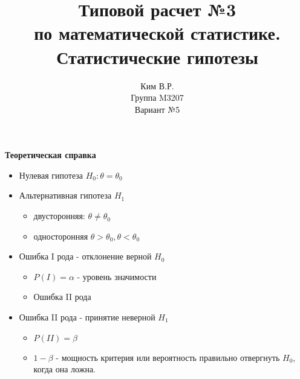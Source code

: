 \documentclass[a4paper,11pt]{article}
\title{Типовой расчет №3 \\ по математической статистике. \\ Статистические гипотезы}
\author{Ким В.Р. \\ Группа M3207 \\ Вариант №5}
\date{}
\newenvironment{shdd}{\begin{mdframed}[backgroundcolor=shadecolor]}{\end{mdframed}}
\theoremstyle{definition}
\begin{document}
    \maketitle

    \begin{shdd}
        \textbf{Теоретическая справка}\par\setlength{\parindent}{0pt}
        \begin{itemize}
            \item Нулевая гипотеза \(H_0 : \theta = \theta_0\)
            \item Альтернативная гипотеза \(H_1\)
            \begin{itemize}
                \item двусторонняя: \(\theta \neq \theta_0\)
                \item односторонняя \(\theta > \theta_0, \theta < \theta_0\)
            \end{itemize}
            \item Ошибка I рода - отклонение верной \(H_0\)
            \begin{itemize}
                \item \(P(I) = \alpha\) - уровень значимости
                \item Ошибка II рода
            \end{itemize}
            \item Ошибка II рода - принятие неверной \(H_1\)
            \begin{itemize}
                \item \(P(II) = \beta\)
                \item \(1 - \beta\) - мощность критерия
                или вероятность правильно отвергнуть \(H_0\), когда она ложна.
            \end{itemize}
        \end{itemize}
    \end{shdd}
    \vspace{10pt}
\end{document}

